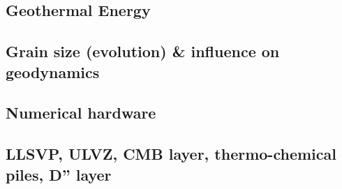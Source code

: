 \subsection{Geothermal Energy} 

{\scriptsize
\noindent
\cite{quxm15}
\cite{revf19}
}

\subsection{Grain size (evolution) \& influence on geodynamics}
\label{sec:topics:gsev}

{\scriptsize
\noindent
\cite{kara84}
\cite{brcp99}
\cite{dets01}\cite{solo01}
\cite{soet02}
\cite{hapa03}\cite{reyu03}
\cite{sore08}
\cite{rorb11}
\cite{beri13}
\cite{besr14}
\cite{thrk15}\cite{tukb15}\cite{pevp15}\cite{glfa15}
\cite{ceww17}\cite{daef17}\cite{mube17}\cite{scdu17}
\cite{bemu18}\cite{bezb18}\cite{mube18}
\cite{mube19}
}

\subsection{Numerical hardware}
\label{sec:topics:hardware}

\cite{oebm06}



\subsection{LLSVP, ULVZ, CMB layer, thermo-chemical piles, D'' layer}

